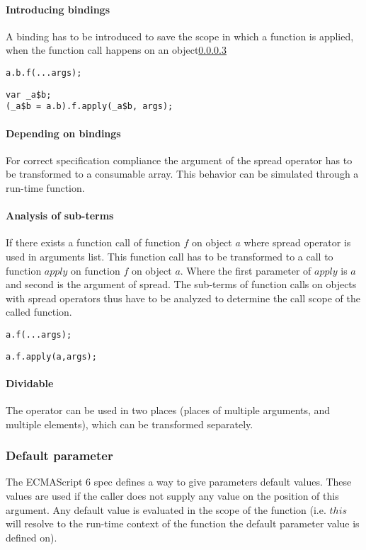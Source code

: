 \paragraph{Introducing bindings}
A binding has to be introduced to save the scope in which a function is applied, when the function call happens on an object\ref{spread-analysis-sub-terms}

\begin{lstlisting}
a.b.f(...args);
\end{lstlisting}
\begin{lstlisting}
var _a$b;
(_a$b = a.b).f.apply(_a$b, args);
\end{lstlisting}

\paragraph{Depending on bindings}
For correct specification compliance the argument of the spread operator has to be transformed to a consumable array. This behavior can be simulated through a run-time function.

\paragraph{Analysis of sub-terms} \label{spread-analysis-sub-terms}
If there exists a function call of function $f$ on object $a$ where spread operator is used in arguments list. This function call has to be transformed to a call to function $apply$ on function $f$ on object $a$. Where the first parameter of $apply$ is $a$ and second is the argument of spread. The sub-terms of function calls on objects with spread operators thus have to be analyzed to determine the call scope of the called function.

\begin{lstlisting}
a.f(...args);
\end{lstlisting}
\begin{lstlisting}[caption={apply function with correct $this$ scope}]
a.f.apply(a,args);
\end{lstlisting}

\paragraph{Dividable}
The operator can be used in two places (places of multiple arguments, and multiple elements), which can be transformed separately.

\subsubsection{Default parameter}
The ECMAScript 6 spec defines a way to give parameters default values\cite[9.2.12]{SpecJS}. These values are used if the caller does not supply any value on the position of this argument. Any default value is evaluated in the scope of the function (i.e. $this$ will resolve to the run-time context of the function the default parameter value is defined on).


